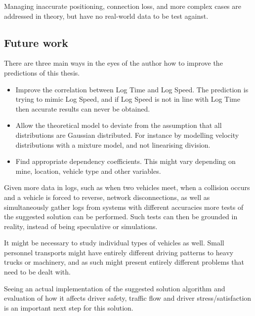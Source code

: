 \documentclass{article}
\begin{document}
		Managing inaccurate positioning, connection loss, and more complex cases are addressed in theory, but have no real-world data to be test against.

        \subsection{Future work}
			There are three main ways in the eyes of the author how to improve the predictions of this thesis.
			\begin{itemize}
				\item Improve the correlation between Log Time and Log Speed. The prediction is trying to mimic Log Speed, and if Log Speed is not in line with Log Time then accurate results can never be obtained.
				\item Allow the theoretical model to deviate from the assumption that all distributions are Gaussian distributed. For instance by modelling velocity distributions with a mixture model, and not linearising division.
				\item Find appropriate dependency coefficients. This might vary depending on mine, location, vehicle type and other variables.
			\end{itemize}

			Given more data in logs, such as when two vehicles meet, when a collision occurs and a vehicle is forced to reverse, network disconnections, as well as simultaneously gather logs from systems with different accuracies more tests of the suggested solution can be performed. Such tests can then be grounded in reality, instead of being speculative or simulations.

			It might be necessary to study individual types of vehicles as well. Small personnel transports might have entirely different driving patterns to heavy trucks or machinery, and as such might present entirely different problems that need to be dealt with.

			Seeing an actual implementation of the suggested solution algorithm and evaluation of how it affects driver safety, traffic flow and driver stress/satisfaction is an important next step for this solution.
	\printbibliography
\end{document}
